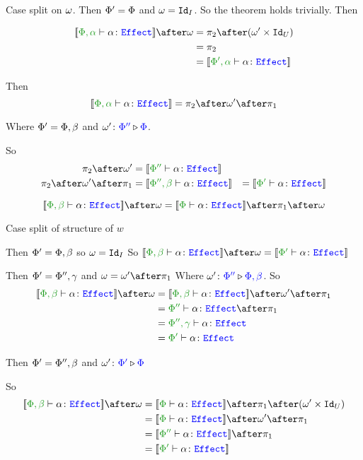 \documentclass{report}
\begin{document}
Case split on $\w$.
\subcase{$\w = \i$}
Then $\P' = \P$ and $\w = \Id{I}$. So the theorem holds trivially.
Then

\begin{align*}
    \deno{\typerelation{\P,\a}{\a}{\effect}}\after\w &= \pp\after(\w'\times \Id{U}) \\
    & = \pp\\
    & = \deno{\typerelation{\P',\a}{\a}{\effect}}
\end{align*}

Then \begin{equation}
    \deno{\typerelation{\P,\a}{\a}{\effect}} = \pp\after\w'\after\p
\end{equation}

Where $\P' = \P,\b$ and $\wrel{\w'}{\P''}{\P}$.

So\begin{align*}
    \pp\after\w' & = \deno{\typerelation{\P''}{\a}{\effect}}
    \\
    \pp\after\w'\after\p & =\deno{\typerelation{\P'',\b}{\a}{\effect}}
    &= \deno{\typerelation{\P'}{\a}{\effect}}
\end{align*}

\begin{equation}
    \deno{\typerelation{\P,\b}{\a}{\effect}}\after\w = \deno{\typerelation{\P}{\a}{\effect}}\after\p\after\w
\end{equation}

Case split of structure of $w$

\subcase{$\w=\i$}
Then $\P' = \P,\b$ so $\w=\Id{I}$
So $\deno{\typerelation{\P,\b}{\a}{\effect}}\after\w = \deno{\typerelation{\P'}{\a}{\effect}}$

Then $\P' = \P'',\g$ and $\w=\w'\after\p$
Where $\wrel{\w'}{\P''}{\P,\b}$.
So
\begin{align*}
    \deno{\typerelation{\P,\b}{\a}{\effect}}\after\w & = \deno{\typerelation{\P,\b}{\a}{\effect}}\after\w'\after\p\\
    & = {\typerelation{\P''}{\a}{\effect}}\after\p\\
    & = {\typerelation{\P'',\g}{\a}{\effect}}\\
    & = {\typerelation{\P'}{\a}{\effect}}\\
\end{align*}

Then $\P'=\P'',\b$ and $\wrel{\w'}{\P'}{\P}$

So \begin{align*}
    \deno{\typerelation{\P,\b}{\a}{\effect}}\after\w &= \deno{\typerelation{\P}{\a}{\effect}}\after\p\after(\w'\times\Id{U})\\
    &=\deno{\typerelation{\P}{\a}{\effect}}\after\w'\after\p\\
    & = \deno{\typerelation{\P''}{\a}{\effect}}\after\p\\
    & = \deno{\typerelation{\P'}{\a}{\effect}}\\
\end{align*}
\end{document}

